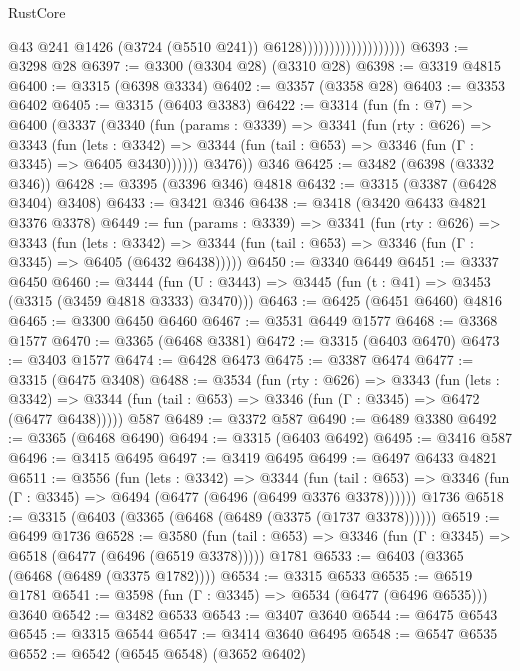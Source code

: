 \begin{lexlean}{RustCore}
\begin{coremodule}
                                          @43
                                          @241
                                          @1426
                                          (@3724 (@5510 @241))
                                          @6128)))))))))))))))))))
@6393 := @3298 @28
@6397 := @3300 (@3304 @28) (@3310 @28)
@6398 := @3319 @4815
@6400 := @3315 (@6398 @3334)
@6402 := @3357 (@3358 @28)
@6403 := @3353 @6402
@6405 := @3315 (@6403 @3383)
@6422 := @3314
    (fun (fn : @7) =>
    @6400
      (@3337
        (@3340
          (fun (params : @3339) =>
          @3341
            (fun (rty : @626) =>
            @3343
              (fun (lets : @3342) =>
              @3344 (fun (tail : @653) => @3346 (fun (Γ : @3345) => @6405 @3430))))))
        @3476))
    @346
@6425 := @3482 (@6398 (@3332 @346))
@6428 := @3395 (@3396 @346) @4818
@6432 := @3315 (@3387 (@6428 @3404) @3408)
@6433 := @3421 @346
@6438 := @3418 (@3420 @6433 @4821 @3376 @3378)
@6449 := fun (params : @3339) =>
  @3341
    (fun (rty : @626) =>
    @3343
      (fun (lets : @3342) =>
      @3344 (fun (tail : @653) => @3346 (fun (Γ : @3345) => @6405 (@6432 @6438)))))
@6450 := @3340 @6449
@6451 := @3337 @6450
@6460 := @3444 (fun (U : @3443) => @3445 (fun (t : @41) => @3453 (@3315 (@3459 @4818 @3333) @3470)))
@6463 := @6425 (@6451 @6460) @4816
@6465 := @3300 @6450 @6460
@6467 := @3531 @6449 @1577
@6468 := @3368 @1577
@6470 := @3365 (@6468 @3381)
@6472 := @3315 (@6403 @6470)
@6473 := @3403 @1577
@6474 := @6428 @6473
@6475 := @3387 @6474
@6477 := @3315 (@6475 @3408)
@6488 := @3534
    (fun (rty : @626) =>
    @3343
      (fun (lets : @3342) =>
      @3344 (fun (tail : @653) => @3346 (fun (Γ : @3345) => @6472 (@6477 @6438)))))
    @587
@6489 := @3372 @587
@6490 := @6489 @3380
@6492 := @3365 (@6468 @6490)
@6494 := @3315 (@6403 @6492)
@6495 := @3416 @587
@6496 := @3415 @6495
@6497 := @3419 @6495
@6499 := @6497 @6433 @4821
@6511 := @3556
    (fun (lets : @3342) =>
    @3344
      (fun (tail : @653) => @3346 (fun (Γ : @3345) => @6494 (@6477 (@6496 (@6499 @3376 @3378))))))
    @1736
@6518 := @3315 (@6403 (@3365 (@6468 (@6489 (@3375 (@1737 @3378))))))
@6519 := @6499 @1736
@6528 := @3580
    (fun (tail : @653) => @3346 (fun (Γ : @3345) => @6518 (@6477 (@6496 (@6519 @3378)))))
    @1781
@6533 := @6403 (@3365 (@6468 (@6489 (@3375 @1782))))
@6534 := @3315 @6533
@6535 := @6519 @1781
@6541 := @3598 (fun (Γ : @3345) => @6534 (@6477 (@6496 @6535))) @3640
@6542 := @3482 @6533
@6543 := @3407 @3640
@6544 := @6475 @6543
@6545 := @3315 @6544
@6547 := @3414 @3640 @6495
@6548 := @6547 @6535
@6552 := @6542 (@6545 @6548) (@3652 @6402)

\end{coremodule}
\end{lexlean}
